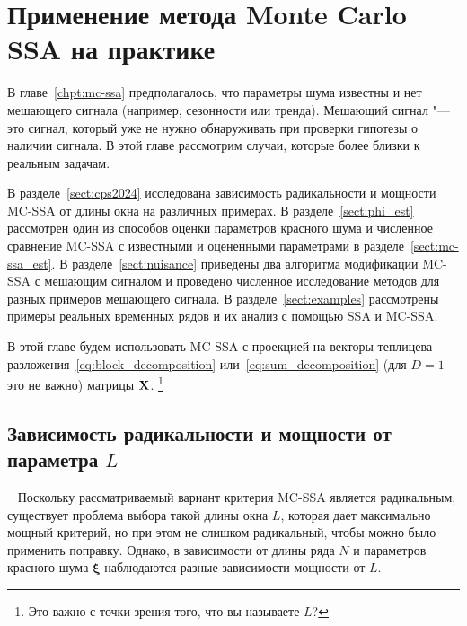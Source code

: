 \documentclass[specialist,
substylefile = spbu_report.rtx,
subf,href,colorlinks=true, 12pt]{disser}
\theoremstyle{definition}
\newcommand{\bfxi}{\boldsymbol{\xi}}
\begin{document}

\chapter{Применение метода Monte Carlo SSA на практике}\label{chpt:mc_ssa_real}
В главе~\ref{chpt:mc-ssa} предполагалось, что параметры шума известны и нет мешающего сигнала (например, сезонности или тренда). Мешающий сигнал "--- это сигнал, который уже не нужно обнаруживать при проверки гипотезы о наличии сигнала.  В этой главе рассмотрим случаи, которые более близки к реальным задачам.

В разделе~\ref{sect:cps2024} исследована зависимость радикальности и мощности MC-SSA от длины окна на различных примерах. В разделе~\ref{sect:phi_est} рассмотрен один из способов оценки параметров красного шума и численное сравнение MC-SSA с известными и оцененными параметрами в разделе~\ref{sect:mc-ssa_est}. В разделе~\ref{sect:nuisance} приведены два алгоритма модификации MC-SSA с мешающим сигналом и проведено численное исследование методов для разных примеров мешающего сигнала. В разделе~\ref{sect:examples} рассмотрены примеры реальных временных рядов и их анализ с помощью SSA и MC-SSA.


В этой главе будем использовать MC-SSA с проекцией на векторы теплицева разложения~\eqref{eq:block_decomposition} или~\eqref{eq:sum_decomposition} (для $D=1$ это не важно) матрицы $\mathbf{X}$.
\footnote{Это важно с точки зрения того, что вы называете $L$?}

\section{Зависимость радикальности и мощности от параметра $L$}~\label{sect:cps2024}
Поскольку рассматриваемый вариант критерия MC-SSA является радикальным, существует проблема выбора такой длины окна $L$, которая дает максимально мощный критерий, но при этом не слишком радикальный, чтобы можно было применить поправку. Однако, в зависимости от длины ряда $N$ и параметров красного шума $\bfxi$ наблюдаются разные зависимости мощности от $L$.
\end{document}
